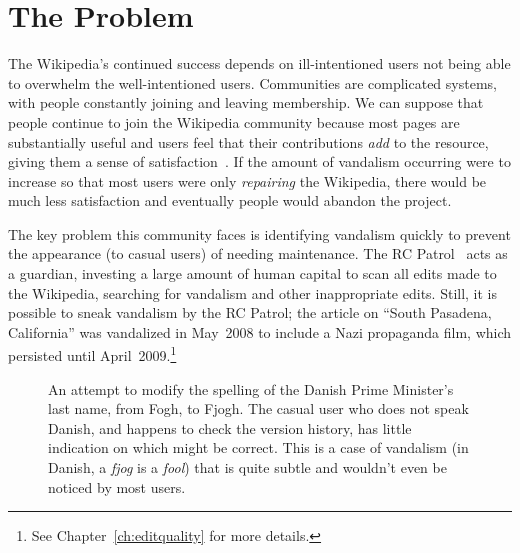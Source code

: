 \section{The Problem}

The Wikipedia's continued success depends on ill-intentioned users
not being able to overwhelm the well-intentioned users.
Communities are complicated systems, with people constantly joining and
leaving membership.
We can suppose that people continue to
join the Wikipedia community because most pages are
substantially useful and users feel that their contributions
\textit{add} to the resource,
giving them a sense of satisfaction~\cite{Benkler2002}.
If the amount of vandalism occurring were to increase so that
most users were only \textit{repairing} the Wikipedia, there
would be much less satisfaction and eventually people would
abandon the project.

The key problem this community faces is identifying vandalism
quickly to prevent the appearance (to casual users)
 of needing maintenance.
The RC Patrol~\cite{wiki:RCPatrol} acts as a guardian,
investing a large amount of human capital to scan all
edits made to the Wikipedia, searching for vandalism and
other inappropriate edits.
Still, it is possible to sneak vandalism by the
RC Patrol; the article on ``South Pasadena, California''
was vandalized in May~2008 to include a Nazi propaganda film,
which persisted until April~2009.\footnote{See Chapter~\ref{ch:editquality}
for more details.}

\begin{figure}[t]
\centering
{}
\hspace{1ex}
\caption[An example of vandalism which is non-obvious to the casual reader.]{An attempt to modify the
  spelling of the Danish Prime Minister's last name, from Fogh, to Fjogh.
  The casual user who does not speak Danish, and happens to check
  the version history, has little indication on which might be correct.
  This is a case of vandalism
  (in Danish, a \textit{fjog} is a \textit{fool})
  that is quite subtle and wouldn't even be noticed by most users.}
\label{fig-denmark}
\end{figure}


